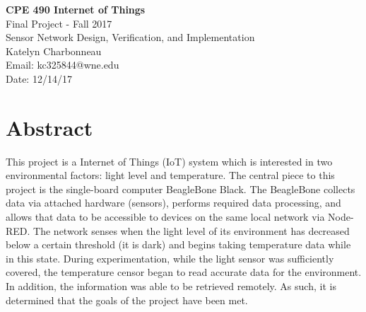 \documentclass[12pt]{article}
\begin{document}
\begin{figure}[htb]
\hfil \hspace{.5in}
\end{figure}



\begin{center}
{\Large {\bf CPE 490 Internet of Things}}\\
\vspace{0.2in}
Final Project - Fall 2017 \\ 
\vspace{0.2in}
{\Large{Sensor Network Design, Verification, and Implementation}} \\
\vspace{0.2in}
Katelyn Charbonneau \\
Email: kc325844@wne.edu\\
Date: 12/14/17
\end{center}


\newpage

\tableofcontents

\newpage

\section*{Abstract} \label{sec:abstract}
This project is a Internet of Things (IoT) system which is interested in two environmental factors: light level and temperature.  The central piece to this project is the single-board computer BeagleBone Black.  The BeagleBone collects data via attached hardware (sensors), performs required data processing, and allows that data to be accessible to devices on the same local network via Node-RED.  The network senses when the light level of its environment has decreased below a certain threshold (it is dark) and begins taking temperature data while in this state.  During experimentation, while the light sensor was sufficiently covered, the temperature censor began to read accurate data for the environment.  In addition, the information was able to be retrieved remotely.  As such, it is determined that the goals of the project have been met.
\end{document}

